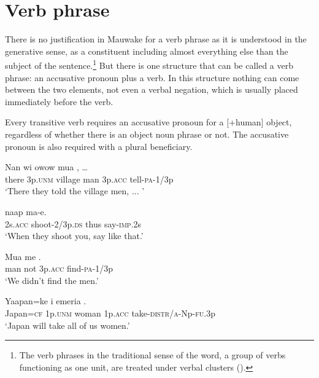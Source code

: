 \section{Verb phrase} \label{sec:4.5}
{}
There is no justification in Mauwake for a verb phrase as it is understood in the generative sense, as a constituent including almost everything else than the subject of the sentence.\footnote{The verb phrases in the traditional sense of the word, a group of verbs functioning as one unit, are treated under verbal clusters ().}  But there is one structure that can be called a verb phrase: an accusative pronoun plus a verb.  In this structure nothing can come between the two elements, not even a verbal negation, which is usually placed immediately before the verb.

Every transitive verb requires an accusative pronoun for a [+human] object, regardless of whether there is an object noun phrase or not. The accusative pronoun is also required with a plural beneficiary. 

\ea%
\label{ex:4:x848}
\gll Nan  wi  owow  mua   ,  {\dots} \\
  there  3p.\textsc{unm}  village  man  3p.\textsc{acc}  tell-\textsc{pa}-1/3p    \\
\glt`There they told the village men, ... '
\z

\ea%
\label{ex:4:x852}
\gll {}   naap  ma-e. \\
    2s.\textsc{acc}  shoot-2/3p.\textsc{ds}  thus  say-\textsc{imp}.2s  \\
\glt`When they shoot you, say like that.'
\z

\ea%
\label{ex:4:x849}
\gll Mua  me   . \\
   man  not  3p.\textsc{acc}  find-\textsc{pa}-1/3p   \\
\glt`We didn't find the men.'
\z

\ea%
\label{ex:4:x850}
\gll Yaapan=ke  i  emeria   . \\
   Japan=\textsc{cf}  1p.\textsc{unm}  woman  1p.\textsc{acc}  take-\textsc{distr}/\textsc{a}-Np-\textsc{fu}.3p   \\
\glt`Japan will take all of us women.'
\z

